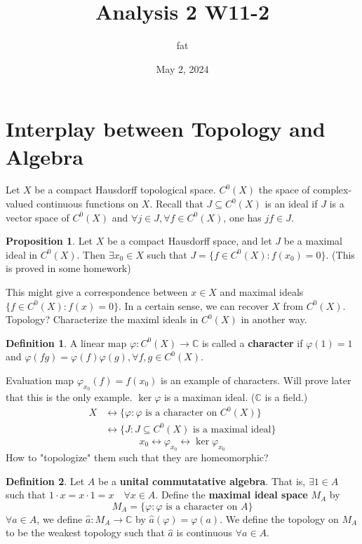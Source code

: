 \documentclass{article}
\title{Analysis 2 W11-2}
\author{fat}
\date{May 2, 2024}
\theoremstyle{definition}
\newtheorem{dfn}{Definition}
\newtheorem{prop}{Proposition}
\newcommand{\CC}{\mathbb C}
\newcommand{\lra}{\leftrightarrow}
\begin{document}
\maketitle
\thispagestyle{fancy}
\renewcommand{\footrulewidth}{0.4pt}
\cfoot{\thepage}
\renewcommand{\headrulewidth}{0.4pt}

\section{Interplay between Topology and Algebra}

Let $X$ be a compact Hausdorff topological space.
$C^0(X)$ the space of complex-valued continuous functions on $X$.
Recall that $J \subseteq C^0(X)$ is an ideal if $J$ is a vector space of $C^0(X)$ and $\forall j \in J, \forall f \in C^0(X)$, one has $jf \in J$.

\begin{prop}
	Let $X$ be a compact Hausdorff space, and let $J$ be a maximal ideal in $C^0(X)$.
	Then $\exists x_0 \in X$ such that $J = \{f \in C^0(X): f(x_0) = 0\}$.
	(This is proved in some homework)
\end{prop}

This might give a correspondence between $x \in X$ and maximal ideals $\{f \in C^0(X): f(x) = 0\}$. 
In a certain sense, we can recover $X$ from $C^0(X)$.
Topology? 
Characterize the maximl ideals in $C^0(X)$ in another way.

\begin{dfn}
	A linear map $\varphi: C^0(X) \to \CC$ is called a \textbf{character} if $\varphi(1) = 1$ and $\varphi(fg) = \varphi(f) \varphi(g), \forall f, g \in C^0(X)$.
\end{dfn}

Evaluation map $\varphi_{x_0}(f) = f(x_0)$ is an example of characters.
Will prove later that this is the only example.
$\ker \varphi$ is a maximan ideal. ($\CC$ is a field.)
\[
	\begin{split}
		X &\lra \{ \varphi: \varphi \text{ is a character on }C^0(X)\}\\
		& \lra \{ J: J \subseteq C^0(X) \text{ is a maximal ideal}\}
	\end{split}
\]
\[
	x_0 \lra \varphi_{x_0} \lra \ker \varphi_{x_0}
\]
How to "topologize" them such that they are homeomorphic?

\begin{dfn}
	Let $A$ be a \textbf{unital commutatative algebra}.
	That is, $\exists 1 \in A$ such that $1 \cdot x = x \cdot 1 = x \quad \forall x \in A$.
	Define the \textbf{maximal ideal space} $M_A$ by 
	\[
		M_A = \{\varphi: \varphi \text{ is a character on } A\}
	\]
	$\forall a \in A$, we define $\hat{a}: M_A \to \CC$ by $\hat{a}(\varphi) = \varphi(a)$.
	We define the topology on $M_A$ to be the weakest topology such that $\hat{a}$ is continuous $\forall a \in A$.
\end{dfn}
\end{document}
